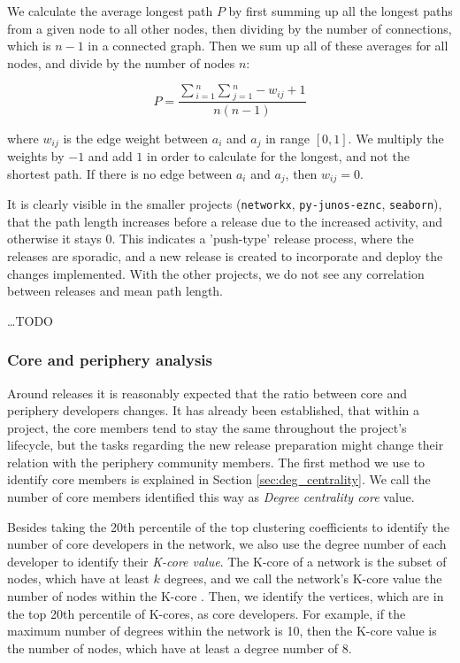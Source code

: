 We calculate the average longest path $P$ by first summing up all the longest paths from a given node to all other nodes, then dividing by the number of connections, which is $n-1$ in a connected graph. Then we sum up all of these averages for all nodes, and divide by the number of nodes $n$:

\[ P = \frac{\sum{_{i=1}^{n}} \sum{_{j=1}^{n} -w_{ij}+1} }{n(n-1)} \]

where $w_{ij}$ is the edge weight between $a_i$ and $a_j$ in range $[0, 1]$. We multiply the weights by $-1$ and add $1$ in order to calculate for the longest, and not the shortest path. If there is no edge between $a_i$ and $a_j$, then $w_{ij}=0$.

It is clearly visible in the smaller projects (\texttt{networkx}, \texttt{py-junos-eznc}, \texttt{seaborn}), that the path length increases before a release due to the increased activity, and otherwise it stays $0$. This indicates a 'push-type' release process, where the releases are sporadic, and a new release is created to incorporate and deploy the changes implemented. With the other projects, we do not see any correlation between releases and mean path length.

\dots TODO

\subsubsection{Core and periphery analysis}

Around releases it is reasonably expected that the ratio between core and periphery developers changes. It has already been established, that within a project, the core members tend to stay the same throughout the project's lifecycle, but the tasks regarding the new release preparation might change their relation with the periphery community members. The first method we use to identify core members is explained in Section \ref{sec:deg_centrality}. We call the number of core members identified this way as \textit{Degree centrality core} value. 

Besides taking the 20th percentile of the top clustering coefficients to identify the number of core developers in the network, we also use the degree number of each developer to identify their \textit{K-core value}. The K-core of a network is the subset of nodes, which have at least $k$ degrees, and we call the network's K-core value the number of nodes within the K-core \cite{batageljAlgorithmCoresDecomposition2003}. Then, we identify the vertices, which are in the top 20th percentile of K-cores, as core developers. For example, if the maximum number of degrees within the network is 10, then the K-core value is the number of nodes, which have at least a degree number of 8.

